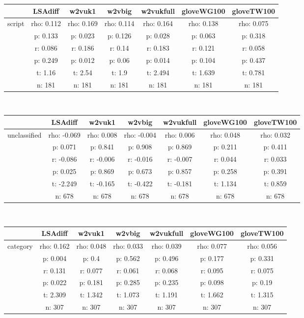 \documentclass{article}
\begin{document}
\begin{tabular}{ccccccc|}\cline{2-7}
&\multicolumn{1}{|c}{LSAdiff} & w2vuk1 & w2vbig & w2vukfull & gloveWG100 & gloveTW100 \\\hline
\multicolumn{1}{|c|}{\multirow{6}{*}{script}} & rho: 0.112 & rho: 0.169 & rho: 0.114 & rho: 0.164 & rho: 0.138 & rho: 0.075 \\
\multicolumn{1}{|c|}{} & p: 0.133 & p: 0.023 & p: 0.126 & p: 0.028 & p: 0.063 & p: 0.318 \\
\multicolumn{1}{|c|}{} & r: 0.086 & r: 0.186 & r: 0.14 & r: 0.183 & r: 0.121 & r: 0.058 \\
\multicolumn{1}{|c|}{} & p: 0.249 & p: 0.012 & p: 0.06 & p: 0.014 & p: 0.104 & p: 0.437 \\
\multicolumn{1}{|c|}{} & t: 1.16 & t: 2.54 & t: 1.9 & t: 2.494 & t: 1.639 & t: 0.781 \\
\multicolumn{1}{|c|}{} & n: 181 & n: 181 & n: 181 & n: 181 & n: 181 & n: 181 \\
\hline
\end{tabular}\\
\begin{tabular}{ccccccc|}\cline{2-7}
&\multicolumn{1}{|c}{LSAdiff} & w2vuk1 & w2vbig & w2vukfull & gloveWG100 & gloveTW100 \\\hline
\multicolumn{1}{|c|}{\multirow{6}{*}{unclassified}} & rho: -0.069 & rho: 0.008 & rho: -0.004 & rho: 0.006 & rho: 0.048 & rho: 0.032 \\
\multicolumn{1}{|c|}{} & p: 0.071 & p: 0.841 & p: 0.908 & p: 0.869 & p: 0.211 & p: 0.411 \\
\multicolumn{1}{|c|}{} & r: -0.086 & r: -0.006 & r: -0.016 & r: -0.007 & r: 0.044 & r: 0.033 \\
\multicolumn{1}{|c|}{} & p: 0.025 & p: 0.869 & p: 0.673 & p: 0.857 & p: 0.258 & p: 0.391 \\
\multicolumn{1}{|c|}{} & t: -2.249 & t: -0.165 & t: -0.422 & t: -0.181 & t: 1.134 & t: 0.859 \\
\multicolumn{1}{|c|}{} & n: 678 & n: 678 & n: 678 & n: 678 & n: 678 & n: 678 \\
\hline
\end{tabular}\\
\begin{tabular}{ccccccc|}\cline{2-7}
&\multicolumn{1}{|c}{LSAdiff} & w2vuk1 & w2vbig & w2vukfull & gloveWG100 & gloveTW100 \\\hline
\multicolumn{1}{|c|}{\multirow{6}{*}{category}} & rho: 0.162 & rho: 0.048 & rho: 0.033 & rho: 0.039 & rho: 0.077 & rho: 0.056 \\
\multicolumn{1}{|c|}{} & p: 0.004 & p: 0.4 & p: 0.562 & p: 0.496 & p: 0.177 & p: 0.331 \\
\multicolumn{1}{|c|}{} & r: 0.131 & r: 0.077 & r: 0.061 & r: 0.068 & r: 0.095 & r: 0.075 \\
\multicolumn{1}{|c|}{} & p: 0.022 & p: 0.181 & p: 0.285 & p: 0.235 & p: 0.098 & p: 0.19 \\
\multicolumn{1}{|c|}{} & t: 2.309 & t: 1.342 & t: 1.073 & t: 1.191 & t: 1.662 & t: 1.315 \\
\multicolumn{1}{|c|}{} & n: 307 & n: 307 & n: 307 & n: 307 & n: 307 & n: 307 \\
\hline
\end{tabular}\\
\end{document}
